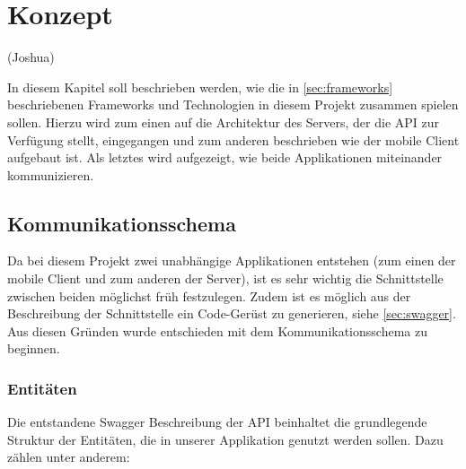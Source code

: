 \chapter{Konzept}

(Joshua)

In diesem Kapitel soll beschrieben werden, wie die in \autoref{sec:frameworks} beschriebenen Frameworks und Technologien in diesem Projekt zusammen spielen sollen. Hierzu wird zum einen auf die Architektur des Servers, der die API zur Verfügung stellt, eingegangen und zum anderen beschrieben wie der mobile Client aufgebaut ist. Als letztes wird aufgezeigt, wie beide Applikationen miteinander kommunizieren.

	\section{Kommunikationsschema}
	Da bei diesem Projekt zwei unabhängige Applikationen entstehen (zum einen der mobile Client und zum anderen der Server), ist es sehr wichtig die Schnittstelle zwischen beiden möglichst früh festzulegen. Zudem ist es möglich aus der Beschreibung der Schnittstelle ein Code-Gerüst zu generieren, siehe \autoref{sec:swagger}. Aus diesen Gründen wurde entschieden mit dem Kommunikationsschema zu beginnen.
	
	\subsection{Entitäten}\label{sec:entities}
	
	Die entstandene Swagger Beschreibung der API beinhaltet die grundlegende Struktur der Entitäten, die in unserer Applikation genutzt werden sollen. Dazu zählen unter anderem:
	
